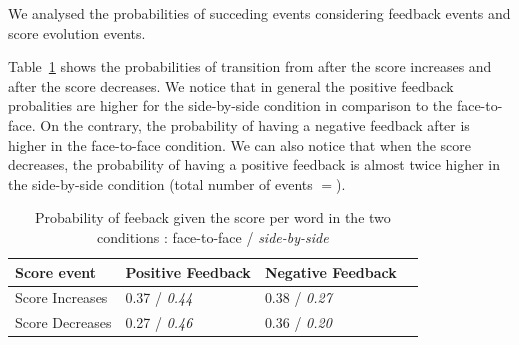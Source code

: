 \documentclass[letterpaper, 10 pt, conference]{ieeeconf}  %
\begin{document}
We analysed the probabilities of succeding events considering feedback events and score evolution events.

Table~\ref{proba} shows the probabilities of transition from after the score increases and after the score decreases.
We notice that in general the positive feedback probalities are higher for the side-by-side condition in comparison to the face-to-face. 
On the contrary, the probability of having a negative feedback after is higher in the face-to-face condition.
We can also notice that when the score decreases, the probability of having a positive feedback is almost twice higher in the side-by-side condition (total number of events $= $).


\begin{table}[ht!]
\centering
\caption{\small Probability of feeback given the score per word in  the two conditions : face-to-face / \emph{side-by-side}}
\label{proba}
\begin{tabular}{l|p{2cm}|p{2cm}l@{}}
\toprule
Score event & Positive Feedback & Negative Feedback \\
\midrule
Score Increases & 	0.37 / \emph{0.44}	& 0.38 / \emph{0.27} \\
Score Decreases &	0.27 / \emph{0.46}	& 0.36 / \emph{0.20} \\
\bottomrule
\end{tabular}
\end{table}
\end{document}
